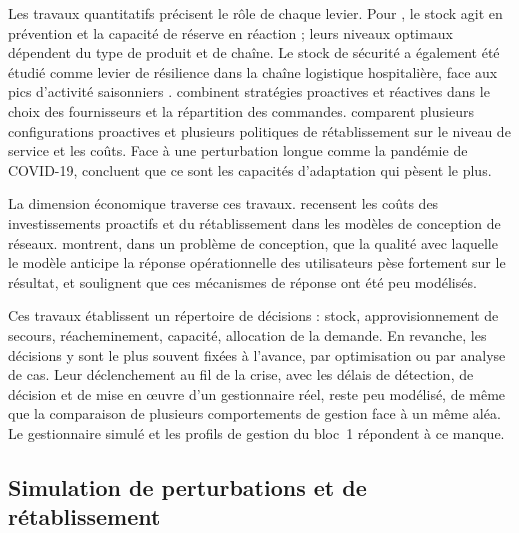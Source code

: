 Les travaux quantitatifs précisent le rôle de chaque levier. Pour \citet{lucker2019}, le stock agit en prévention et la capacité de réserve en réaction ; leurs niveaux optimaux dépendent du type de produit et de chaîne. Le stock de sécurité a également été étudié comme levier de résilience dans la chaîne logistique hospitalière, face aux pics d'activité saisonniers \citep{rahiel2025esd}. \citet{hosseini2019ijpe} combinent stratégies proactives et réactives dans le choix des fournisseurs et la répartition des commandes. \citet{ivanov2016tre} comparent plusieurs configurations proactives et plusieurs politiques de rétablissement sur le niveau de service et les coûts. Face à une perturbation longue comme la pandémie de COVID-19, \citet{ivanovdolgui2021ijpe} concluent que ce sont les capacités d'adaptation qui pèsent le plus.

La dimension économique traverse ces travaux. \citet{aldrighetti2021} recensent les coûts des investissements proactifs et du rétablissement dans les modèles de conception de réseaux. \citet{klibi2012ijpe} montrent, dans un problème de conception, que la qualité avec laquelle le modèle anticipe la réponse opérationnelle des utilisateurs pèse fortement sur le résultat, et soulignent que ces mécanismes de réponse ont été peu modélisés.

Ces travaux établissent un répertoire de décisions : stock, approvisionnement de secours, réacheminement, capacité, allocation de la demande. En revanche, les décisions y sont le plus souvent fixées à l'avance, par optimisation ou par analyse de cas. Leur déclenchement au fil de la crise, avec les délais de détection, de décision et de mise en œuvre d'un gestionnaire réel, reste peu modélisé, de même que la comparaison de plusieurs comportements de gestion face à un même aléa. Le gestionnaire simulé et les profils de gestion du bloc~1 répondent à ce manque.

\subsection{Simulation de perturbations et de rétablissement}
\label{sec:ea-simulation}

